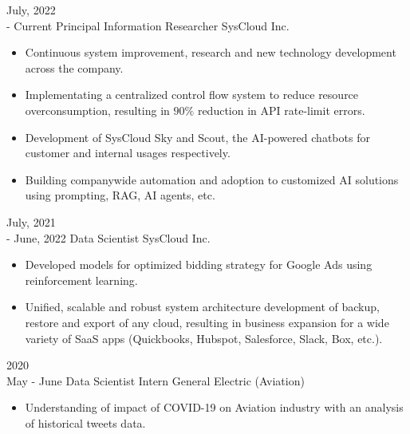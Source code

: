 \documentclass[9pt]{developercv} %
\begin{document}
\vspace{-15 pt}
\begin{entrylist}
    \entry
    {July, 2022\\ - Current}
    {Principal Information Researcher}
    {SysCloud Inc.}
    {\vspace{-7pt}\small
        \begin{itemize}[noitemsep,topsep=0pt,parsep=0pt,partopsep=0pt, leftmargin=-1pt]
            \item Continuous system improvement, research and new technology development across the company.
            \item Implementating a centralized control flow system to reduce resource overconsumption, resulting in $90\%$ reduction in API rate-limit errors.
            \item Development of SysCloud Sky and Scout, the AI-powered chatbots for customer and internal usages respectively.  
            \item Building companywide automation and adoption to customized AI solutions using prompting, RAG, AI agents, etc.
        \end{itemize}
    }
    \entry
    {July, 2021\\- June, 2022}
    {Data Scientist}
    {SysCloud Inc.}
    {\vspace{-7pt}\small
        \begin{itemize}[noitemsep,topsep=0pt,parsep=0pt,partopsep=0pt, leftmargin=-1pt]
            \item Developed models for optimized bidding strategy for Google Ads using reinforcement learning.
            \item Unified, scalable and robust system architecture development of backup, restore and export of any cloud, resulting in business expansion for a wide variety of SaaS apps (Quickbooks, Hubspot, Salesforce, Slack, Box, etc.).
        \end{itemize}
    }
    \entry
    {2020\\\footnotesize{May - June}}
    {Data Scientist Intern}
    {General Electric (Aviation)}
    {\vspace{-7pt}\small
        \begin{itemize}[noitemsep,topsep=0pt,parsep=0pt,partopsep=0pt, leftmargin=-1pt]
            \item Understanding of impact of COVID-19 on Aviation industry with an analysis of historical tweets data.

\end{itemize}}
\end{entrylist}
\end{document}
